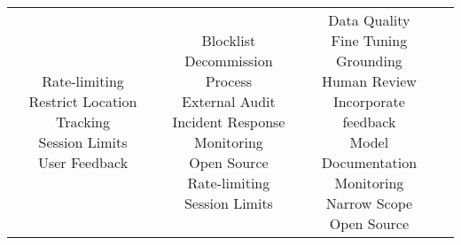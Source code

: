 \documentclass[fleqn]{article}
\begin{document}
\begin{landscape}
\begin{table}[H]
\begin{tabular}{|c|c|c|c|}
{			\textbullet\hspace{3pt} Rate-limiting \\
			\textbullet\hspace{3pt} Restrict Location Tracking\\  		
			\textbullet\hspace{3pt} Session Limits\\ 
			\textbullet\hspace{3pt} User Feedback\\ 		 	 	 
		}
		& \makecell[l]{
			\textbullet\hspace{3pt} Blocklist \\ 	
			\textbullet\hspace{3pt} Decommission Process\\ 	
			\textbullet\hspace{3pt} External Audit\\ 
			\textbullet\hspace{3pt} Incident Response\\  
			\textbullet\hspace{3pt} Monitoring\\ 	
			\textbullet\hspace{3pt} Open Source\\
			\textbullet\hspace{3pt} Rate-limiting \\ 
			\textbullet\hspace{3pt} Session Limits\\ 				 	 
		}
		& \makecell[l]{
			\textbullet\hspace{3pt} Data Quality\\ 
			\textbullet\hspace{3pt} Fine Tuning\\ 	
			\textbullet\hspace{3pt} Grounding\\ 	
			\textbullet\hspace{3pt} Human Review \\ 	
			\textbullet\hspace{3pt} Incorporate feedback \\
			\textbullet\hspace{3pt} Model Documentation \\ 	
			\textbullet\hspace{3pt} Monitoring\\ 	
			\textbullet\hspace{3pt} Narrow Scope\\ 	
			\textbullet\hspace{3pt} Open Source\\ 	
}
\end{tabular}
\end{table}
\end{landscape}
\end{document}
